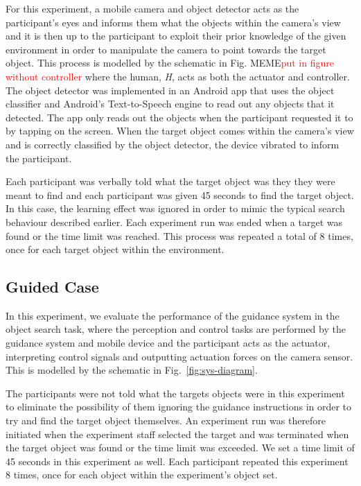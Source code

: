 \documentclass[runningheads]{llncs}
\newcommand\todo[1]{\textcolor{red}{#1}}
\begin{document}
For this experiment, a mobile camera and object detector acts as the participant's eyes and informs them what the objects within the camera's view and it is then up to the participant to exploit their prior knowledge of the given environment in order to manipulate the camera to point towards the target object. 
This process is modelled by the schematic in Fig. MEME\todo{put in figure without controller} where the human, \emph{H}, acts as both the actuator and controller.
The object detector was implemented in an Android app that uses the object classifier and Android's Text-to-Speech engine to read out any objects that it detected. 
The app only reads out the objects when the participant requested it to by tapping on the screen. 
When the target object comes within the camera's view and is correctly classified by the object detector, the device vibrated to inform the participant. 

Each participant was verbally told what the target object was they they were meant to find and each participant was given 45 seconds to find the target object. 
In this case, the learning effect was ignored in order to mimic the typical search behaviour described earlier. 
Each experiment run was ended when a target was found or the time limit was reached. 
This process was repeated a total of 8 times, once for each target object within the environment. 

\subsection{Guided Case}

In this experiment, we evaluate the performance of the guidance system in the object search task, where the perception and control tasks are performed by the guidance system and mobile device and the participant acts as the actuator, interpreting control signals and outputting actuation forces on the camera sensor. 
This is modelled by the schematic in Fig.~\ref{fig:sys-diagram}. 

The participants were not told what the targets objects were in this experiment to eliminate the possibility of them ignoring the guidance instructions in order to try and find the target object themselves.
An experiment run was therefore initiated when the experiment staff selected the target and was terminated when the target object was found or the time limit was exceeded.
We set a time limit of 45 seconds in this experiment as well.
Each participant repeated this experiment 8 times, once for each object within the experiment's object set. 
\end{document}
